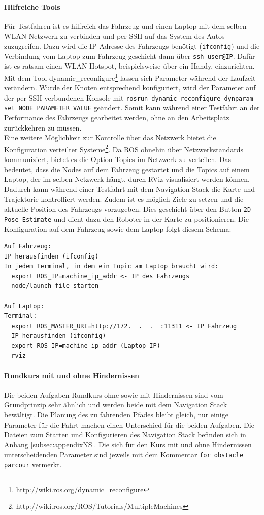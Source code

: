 \paragraph{Hilfreiche Tools}
F\"ur Testfahren ist es hilfreich das Fahrzeug und einen Laptop mit dem selben WLAN-Netzwerk zu verbinden und per SSH auf das System des Autos zuzugreifen. Dazu wird die IP-Adresse des Fahrzeugs ben\"otigt (\texttt{ifconfig}) und die Verbindung vom Laptop zum Fahrzeug geschieht dann \"uber \texttt{ssh user@IP}. Daf\"ur ist es ratsam einen WLAN-Hotspot, beispielsweise \"uber ein Handy, einzurichten.\\
Mit dem Tool dynamic\_reconfigure\footnote{http://wiki.ros.org/dynamic\_reconfigure} lassen sich Parameter w\"ahrend der Laufzeit ver\"andern. Wurde der Knoten entsprechend konfiguriert, wird der Parameter auf der per SSH verbundenen Konsole mit \texttt{rosrun dynamic\_reconfigure dynparam set NODE PARAMETER VALUE} ge\"andert. Somit kann w\"ahrend einer Testfahrt an der Performance des Fahrzeugs gearbeitet werden, ohne an den Arbeitsplatz zur\"uckkehren zu m\"ussen.\\
Eine weitere M\"oglichkeit zur Kontrolle \"uber das Netzwerk bietet die Konfiguration verteilter Systeme\footnote{http://wiki.ros.org/ROS/Tutorials/MultipleMachines}. Da ROS ohnehin \"uber Netzwerkstandards kommuniziert, bietet es die Option Topics im Netzwerk zu verteilen. Das bedeutet, dass die Nodes auf dem Fahrzeug gestartet und die Topics auf einem Laptop, der im selben Netzwerk h\"angt, durch RViz visualisiert werden k\"onnen. Dadurch kann w\"ahrend einer Testfahrt mit dem Navigation Stack die Karte und Trajektorie kontrolliert werden. Zudem ist es m\"oglich Ziele zu setzen und die aktuelle Position des Fahrzeugs vorzugeben. Dies geschieht \"uber den Button \texttt{2D Pose Estimate} und dient dazu den Roboter in der Karte zu positionieren. Die Konfiguration auf dem Fahrzeug sowie dem Laptop folgt diesem Schema:
\begin{lstlisting}
Auf Fahrzeug: 
IP herausfinden (ifconfig) 
In jedem Terminal, in dem ein Topic am Laptop braucht wird:  
  export ROS_IP=machine_ip_addr <- IP des Fahrzeugs 
  node/launch-file starten

Auf Laptop: 
Terminal: 
  export ROS_MASTER_URI=http://172.  .  .  :11311 <- IP Fahrzeug
  IP herausfinden (ifconfig) 
  export ROS_IP=machine_ip_addr (Laptop IP) 
  rviz
\end{lstlisting}

\paragraph{Rundkurs mit und ohne Hindernissen}
Die beiden Aufgaben Rundkurs ohne sowie mit Hindernissen sind vom Grundprinzip sehr \"ahnlich und werden beide mit dem Navigation Stack bew\"altigt. Die Planung des zu fahrenden Pfades bleibt gleich, nur einige Parameter f\"ur die Fahrt machen einen Unterschied f\"ur die beiden Aufgaben. Die Dateien zum Starten und Konfigurieren des Navigation Stack befinden sich in Anhang \ref{subsec:appendixNS}. Die sich f\"ur den Kurs mit und ohne Hindernissen unterscheidenden Parameter sind jeweils mit dem Kommentar \texttt{for obstacle parcour} vermerkt.

